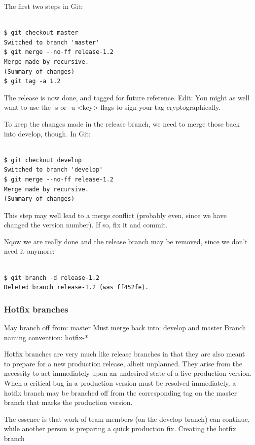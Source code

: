 The first two steps in Git:
\\\\
\begin{verbatim}
$ git checkout master
Switched to branch 'master'
$ git merge --no-ff release-1.2
Merge made by recursive.
(Summary of changes)
$ git tag -a 1.2
\end{verbatim}

The release is now done, and tagged for future reference.
Edit: You might as well want to use the -s or -u <key> flags to sign your tag cryptographically.

To keep the changes made in the release branch, we need to merge those back into
develop, though. In Git:
\\\\
\begin{verbatim}
$ git checkout develop
Switched to branch 'develop'
$ git merge --no-ff release-1.2
Merge made by recursive.
(Summary of changes)
\end{verbatim}

This step may well lead to a merge conflict (probably even, since we have
changed the version number). If so, fix it and commit.

Nqow we are really done and the release branch may be removed, since we don’t
need it anymore:\\\\
\begin{verbatim}
$ git branch -d release-1.2
Deleted branch release-1.2 (was ff452fe).
\end{verbatim}

\subsubsection{Hotfix branches}

May branch off from: master
Must merge back into: develop and master
Branch naming convention: hotfix-*

Hotfix branches are very much like release branches in that they are also meant
to prepare for a new production release, albeit unplanned. They arise from the
necessity to act immediately upon an undesired state of a live production
version. When a critical bug in a production version must be resolved
immediately, a hotfix branch may be branched off from the corresponding tag on
the master branch that marks the production version.

The essence is that work of team members (on the develop branch) can continue,
while another person is preparing a quick production fix. Creating the hotfix
branch


